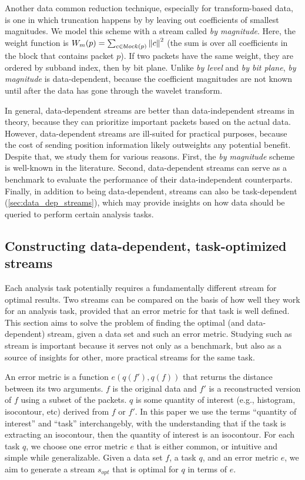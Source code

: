 Another data common reduction technique, especially for transform-based data, is one in which
truncation happens by by leaving out coefficients of smallest magnitudes. We model this scheme with
a stream called \emph{by magnitude}. Here, the weight function is $W_m(p)=\sum_{c\in
block(p)}\left\lVert c\right\rVert^2$ (the sum is over all coefficients in the block that contains packet $p$). If
two packets have the same weight, they are ordered by subband index, then by bit plane. Unlike
\emph{by level} and \emph{by bit plane}, \emph{by magnitude} is data-dependent, because the
coefficient magnitudes are not known until after the data has gone through the wavelet transform.

In general, data-dependent streams are better than data-independent streams in theory, because they
can prioritize important packets based on the actual data. However, data-dependent streams are
ill-suited for practical purposes, because the cost of sending position information likely
outweights any potential benefit. Despite that, we study them for various reasons. First, the
\emph{by magnitude} scheme is well-known in the literature. Second, data-dependent streams can serve
as a benchmark to evaluate the performance of their data-independent counterparts. Finally, in
addition to being data-dependent, streams can also be task-dependent
(\autoref{sec:data_dep_streams}), which may provide insights on how data should be queried to
perform certain analysis tasks.

\subsection{Constructing data-dependent, task-optimized streams}\label{sec:data_dep_streams}
Each analysis task potentially requires a fundamentally different stream for optimal results. Two
streams can be compared on the basis of how well they work for an analysis task, provided that an
error metric for that task is well defined. This section aims to solve the problem of finding the
optimal (and data-dependent) stream, given a data set and such an error metric. Studying such as
stream is important because it serves not only as a benchmark, but also as a source of insights for
other, more practical streams for the same task.

An error metric is a function $e(q(f'),q(f))$ that returns the distance between its two arguments.
$f$ is the original data and $f'$ is a reconstructed version of $f$ using a subset of the packets.
$q$ is some quantity of interest (e.g., histogram, isocontour, etc) derived from $f$ or $f'$. In
this paper we use the terms ``quantity of interest'' and ``task'' interchangebly, with the
understanding that if the task is extracting an isocontour, then the quantity of interest is an
isocontour. For each task $q$, we choose one error metric $e$ that is either common, or intuitive
and simple while generalizable. Given a data set $f$, a task $q$, and an error metric $e$, we aim to
generate a stream $s_{opt}$ that is optimal for $q$ in terms of $e$.

